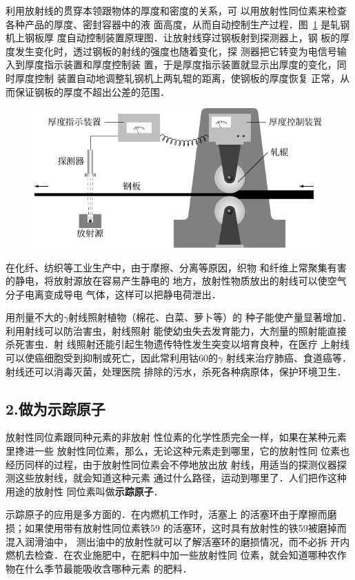 利用放射线的贯穿本领跟物体的厚度和密度的关系，可
以用放射性同位素来检查各种产品的厚度、密封容器中的液
面高度，从而自动控制生产过程．图~\ref{fig_C_9-10} 是轧钢机上钢板厚
度自动控制装置原理图．让放射线穿过钢板射到探测器上，钢
板的厚度发生变化时，透过钢板的射线的强度也随着变化，探
测器把它转变为电信号输入到厚度指示装置和厚度控制装
置，于是厚度指示装置就显示出厚度的变化，同时厚度控制
装置自动地调整轧钢机上两轧辊的距离，使钢板的厚度恢复
正常，从而保证钢板的厚度不超出公差的范围．
\begin{figure}[htbp]
    \centering
    \includegraphics{fig/C/9-10.pdf}
    \caption{}\label{fig_C_9-10}
\end{figure}

在化纤、纺织等工业生产中，由于摩擦、分离等原因，织物
和纤维上常聚集有害的静电，将放射源放在容易产生静电的
地方，放射性物质放出的射线可以使空气分子电离变成导电
气体，这样可以把静电荷泄出．

用剂量不大的$\gamma$射线照射植物（棉花、白菜、萝卜等）的
种子能使产量显著增加．利用射线可以防治害虫，射线照射
能使幼虫失去发育能力，大剂量的照射能直接杀死害虫．射
线照射还能引起生物遗传特性发生突变以培育良种，在医疗
上射线可以使癌细胞受到抑制或死亡，因此常利用钴60的$\gamma$
射线来治疗肺癌、食道癌等．射线还可以消毒灭菌，处理医院
排除的污水，杀死各种病原体，保护环境卫生．

\subsection*{2.做为示踪原子}

放射性同位素跟同种元素的非放射
性位素的化学性质完全一样，如果在某种元素里搀进一些
放射性同位素，那么，无论这种元素走到哪里，它的放射性同
位素也经历同样的过程，由于放射性同位素会不停地放出放
射线，用适当的探测仪器探测这些放射线，就会知道这种元素
通过什么路径，运动到哪里了．人们把作这种用途的放射性
同位素叫做\textbf{示踪原子}．

示踪原子的应用是多方面的．在内燃机工作时，活塞上
的活塞环由于摩擦而磨损；如果使用带有放射性同位素铁59
的活塞环，这时具有放射性的铁59被磨掉而混入润滑油中，
测出油中的放射性就可以了解活塞环的磨损情况，而不必拆
开内燃机去检查．在农业施肥中，在肥料中加一些放射性同
位素，就会知道哪种农作物在什么季节最能吸收含哪种元素
的肥料．

